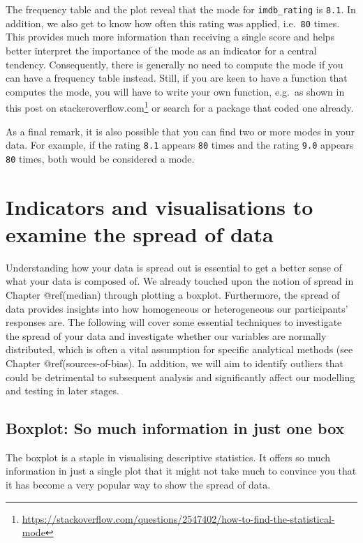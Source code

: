 \documentclass[
  letterpaper,
]{krantz}
\renewcommand{\href}[2]{#2\footnote{\url{#1}}}
\begin{document}
The frequency table and the plot reveal that the mode for
\texttt{imdb\_rating} is \texttt{8.1}. In addition, we also get to know
how often this rating was applied, i.e.~\texttt{80} times. This provides
much more information than receiving a single score and helps better
interpret the importance of the mode as an indicator for a central
tendency. Consequently, there is generally no need to compute the mode
if you can have a frequency table instead. Still, if you are keen to
have a function that computes the mode, you will have to write your own
function, e.g.~as shown in this post on
\href{https://stackoverflow.com/questions/2547402/how-to-find-the-statistical-mode}{stackeroverflow.com}
or search for a package that coded one already.

As a final remark, it is also possible that you can find two or more
modes in your data. For example, if the rating \texttt{8.1} appears
\texttt{80} times and the rating \texttt{9.0} appears \texttt{80} times,
both would be considered a mode.

\section{Indicators and visualisations to examine the spread of
data}\label{sec-spread-of-data}

Understanding how your data is spread out is essential to get a better
sense of what your data is composed of. We already touched upon the
notion of spread in Chapter @ref(median) through plotting a boxplot.
Furthermore, the spread of data provides insights into how homogeneous
or heterogeneous our participants' responses are. The following will
cover some essential techniques to investigate the spread of your data
and investigate whether our variables are normally distributed, which is
often a vital assumption for specific analytical methods (see Chapter
@ref(sources-of-bias). In addition, we will aim to identify outliers
that could be detrimental to subsequent analysis and significantly
affect our modelling and testing in later stages.

\subsection{Boxplot: So much information in just one
box}\label{boxplot-so-much-information-in-just-one-box}

The boxplot is a staple in visualising descriptive statistics. It offers
so much information in just a single plot that it might not take much to
convince you that it has become a very popular way to show the spread of
data.
\end{document}
